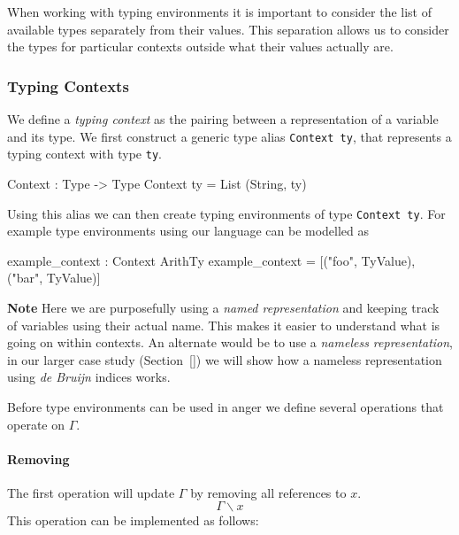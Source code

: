 When working with typing environments it is important to consider the list of available types separately from their values.
This separation allows us to consider the types for particular contexts outside what their values actually are.

\subsubsection{Typing Contexts}
\label{sec:typed-arith-var:contexts}

We define a \emph{typing context} as the pairing between a representation of a variable and its type.
We first construct a generic type alias \texttt{Context ty}, that represents a typing context with type \texttt{ty}.

\begin{code}
Context : Type -> Type
Context ty = List (String, ty)
\end{code}

\noindent
Using this alias we can then create typing environments of type \texttt{Context ty}.
For example type environments using our language can be modelled as

\begin{code}
example_context : Context ArithTy
example_context = [("foo", TyValue), ("bar", TyValue)]
\end{code}

\noindent
\textbf{Note} Here we are purposefully using a \emph{named representation} and keeping track of variables using their actual name.
This makes it easier to understand what is going on within contexts.
An alternate would be to use a \emph{nameless representation}, in our larger case study (Section~\ref{}) we will show how a nameless representation using \emph{de Bruijn} indices works.

Before type environments can be used in anger we define several operations that operate on $\Gamma$.

\paragraph{Removing}
\label{sec:typed-arith-var:types:remove}

The first operation will update $\Gamma$ by removing all references to $x$.
\[
\Gamma\backslash x
\]
\noindent
This operation can be implemented as follows:

